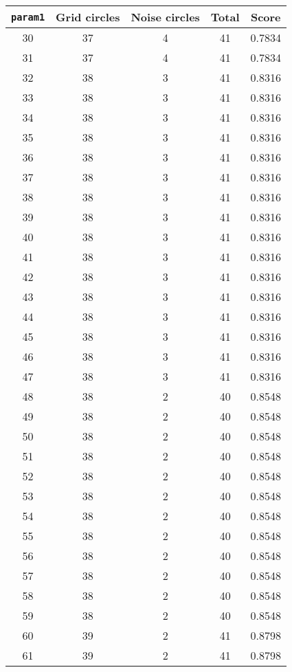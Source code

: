 \documentclass[letterpaper, 12pt]{article}
\begin{document}
\begin{longtable}{|c|c|c|c|c|}
\hline
\textbf{\texttt{param1}} & \textbf{Grid circles} & \textbf{Noise circles} & \textbf{Total} & \textbf{Score} \\
\hline
30 & 37 & 4 & 41 & 0.7834 \\
\hline
31 & 37 & 4 & 41 & 0.7834 \\
\hline
32 & 38 & 3 & 41 & 0.8316 \\
\hline
33 & 38 & 3 & 41 & 0.8316 \\
\hline
34 & 38 & 3 & 41 & 0.8316 \\
\hline
35 & 38 & 3 & 41 & 0.8316 \\
\hline
36 & 38 & 3 & 41 & 0.8316 \\
\hline
37 & 38 & 3 & 41 & 0.8316 \\
\hline
38 & 38 & 3 & 41 & 0.8316 \\
\hline
39 & 38 & 3 & 41 & 0.8316 \\
\hline
40 & 38 & 3 & 41 & 0.8316 \\
\hline
41 & 38 & 3 & 41 & 0.8316 \\
\hline
42 & 38 & 3 & 41 & 0.8316 \\
\hline
43 & 38 & 3 & 41 & 0.8316 \\
\hline
44 & 38 & 3 & 41 & 0.8316 \\
\hline
45 & 38 & 3 & 41 & 0.8316 \\
\hline
46 & 38 & 3 & 41 & 0.8316 \\
\hline
47 & 38 & 3 & 41 & 0.8316 \\
\hline
48 & 38 & 2 & 40 & 0.8548 \\
\hline
49 & 38 & 2 & 40 & 0.8548 \\
\hline
50 & 38 & 2 & 40 & 0.8548 \\
\hline
51 & 38 & 2 & 40 & 0.8548 \\
\hline
52 & 38 & 2 & 40 & 0.8548 \\
\hline
53 & 38 & 2 & 40 & 0.8548 \\
\hline
54 & 38 & 2 & 40 & 0.8548 \\
\hline
55 & 38 & 2 & 40 & 0.8548 \\
\hline
56 & 38 & 2 & 40 & 0.8548 \\
\hline
57 & 38 & 2 & 40 & 0.8548 \\
\hline
58 & 38 & 2 & 40 & 0.8548 \\
\hline
59 & 38 & 2 & 40 & 0.8548 \\
\hline
60 & 39 & 2 & 41 & 0.8798 \\
\hline
61 & 39 & 2 & 41 & 0.8798 \\

\end{longtable}
\end{document}
